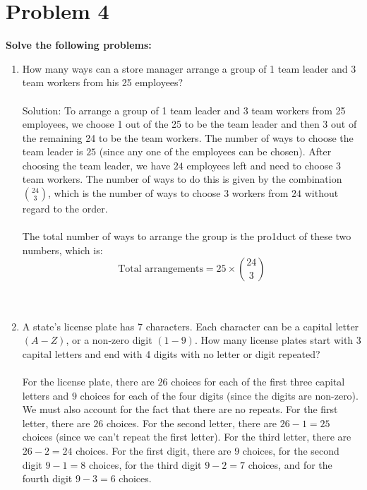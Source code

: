 \documentclass{amsart}
\theoremstyle{definition}
\theoremstyle{Exercise}
\theoremstyle{remark}
\theoremstyle{rule}
\numberwithin{equation}{section}
\begin{document}
  \section*{}
  \section*{Problem 4}
  {\bf Solve the following problems:}
  \begin{enumerate}[label=(\alph*)]
    \item How many ways can a store manager arrange a group of 1 team leader and 3 team workers from his 25 employees?
\\\\
Solution: To arrange a group of 1 team leader and 3 team workers from 25 employees, we choose 1 out of the 25 to be the team leader and then 3 out of the remaining 24 to be the team workers. The number of ways to choose the team leader is \(25\) (since any one of the employees can be chosen). After choosing the team leader, we have \(24\) employees left and need to choose \(3\) team workers. The number of ways to do this is given by the combination \(24 \choose 3\), which is the number of ways to choose \(3\) workers from \(24\) without regard to the order.
\\\\
The total number of ways to arrange the group is the pro1duct of these two numbers, which is:
\[
\text{Total arrangements} = 25 \times \binom{24}{3}
\]
\\\\
    \item A state’s license plate has 7 characters. Each character can be a capital letter $(A-Z)$, or a non-zero digit $(1-9)$. How many license plates start with 3 capital letters and end with 4 digits with no letter or digit repeated?
\\\\
For the license plate, there are \(26\) choices for each of the first three capital letters and \(9\) choices for each of the four digits (since the digits are non-zero). We must also account for the fact that there are no repeats. For the first letter, there are \(26\) choices. For the second letter, there are \(26 - 1 = 25\) choices (since we can't repeat the first letter). For the third letter, there are \(26 - 2 = 24\) choices. For the first digit, there are \(9\) choices, for the second digit \(9 - 1 = 8\) choices, for the third digit \(9 - 2 = 7\) choices, and for the fourth digit \(9 - 3 = 6\) choices.


\end{enumerate}
\end{document}
